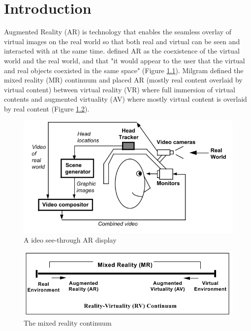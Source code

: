\chapter{Introduction} %
\label{ch:intro} %

Augmented Reality (AR) is technology that enables the seamless overlay of virtual images on the real world so that both real and virtual can be seen and interacted with at the same time. \cite{azuma1997survey} defined AR as the coexistence of the virtual world and the real world, and that "it would appear to the user that the virtual and real objects coexisted in the same space" (Figure \ref{fig:video-see-through}). Milgram \cite{Milgram1995a} defined the mixed reality (MR) continuum and placed AR (mostly real content overlaid by virtual content) between virtual reality (VR) where full immersion of virtual contents and augmented virtuality (AV) where mostly virtual content is overlaid by real content (Figure \ref{fig:mr-continuum}). 

\begin{figure}
    \centering
    \includegraphics[width=.8\linewidth]{images/video-see-through-ar.png}
    \caption{A ideo see-through AR display}
    \label{fig:video-see-through}
\end{figure}

\begin{figure}
    \centering
    \includegraphics[width=.8\linewidth]{images/mixed-reality-continuum.png}
    \caption{The mixed reality continuum}
    \label{fig:mr-continuum}
\end{figure}

